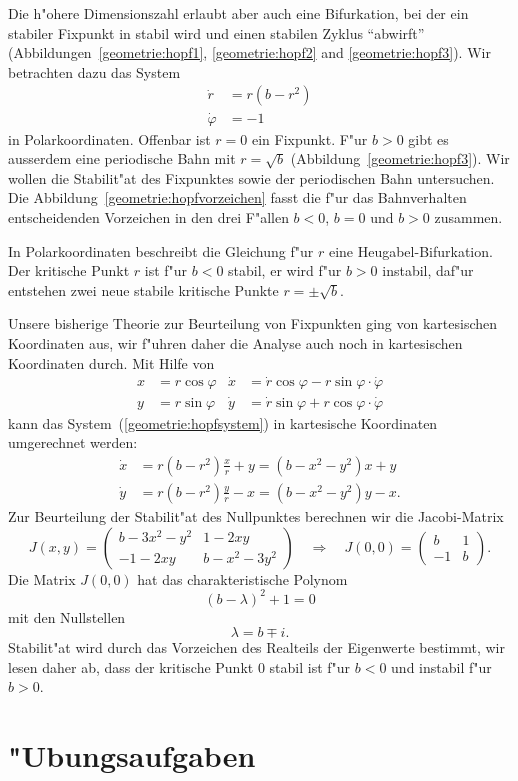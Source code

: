 Die h"ohere Dimensionszahl erlaubt aber auch eine Bifurkation, bei der
ein stabiler Fixpunkt in stabil wird und einen stabilen Zyklus ``abwirft''
(Abbildungen~\ref{geometrie:hopf1}, \ref{geometrie:hopf2} and
\ref{geometrie:hopf3}).
Wir betrachten dazu das System 
\begin{equation}
\begin{aligned}
\dot r      &= r(b-r^2)\\
\dot \varphi&= -1
\end{aligned}
\label{geometrie:hopfsystem}
\end{equation}
in Polarkoordinaten.
Offenbar ist $r=0$ ein Fixpunkt.
F"ur $b>0$ gibt es ausserdem eine periodische Bahn mit $r=\sqrt{b}$
(Abbildung~\ref{geometrie:hopf3}).
Wir wollen die Stabilit"at des Fixpunktes sowie der periodischen Bahn
untersuchen.
Die Abbildung~\ref{geometrie:hopfvorzeichen} fasst die f"ur das Bahnverhalten
entscheidenden Vorzeichen in den drei F"allen $b<0$, $b=0$ und $b>0$
zusammen.

In Polarkoordinaten beschreibt die Gleichung f"ur $r$ eine
Heugabel-Bifurkation.
Der kritische Punkt $r$ ist f"ur $b<0$ stabil, er wird f"ur $b>0$
instabil, daf"ur entstehen zwei neue stabile kritische Punkte
$r=\pm\sqrt{b}$.

Unsere bisherige Theorie zur Beurteilung von Fixpunkten ging von
kartesischen Koordinaten aus, wir f"uhren daher die Analyse auch noch
in kartesischen Koordinaten durch.
Mit Hilfe von 
\[
\begin{aligned}
x&=r\cos\varphi&\dot x&=\dot r\cos\varphi-r\sin\varphi\cdot\dot\varphi\\
y&=r\sin\varphi&\dot y&=\dot r\sin\varphi+r\cos\varphi\cdot\dot\varphi
\end{aligned}
\]
kann das System~(\ref{geometrie:hopfsystem}) in kartesische Koordinaten
umgerechnet werden:
\begin{equation}
\begin{aligned}
\dot x&=r(b-r^2)\frac{x}{r}+y=(b-x^2-y^2)x+y\\
\dot y&=r(b-r^2)\frac{y}{r}-x=(b-x^2-y^2)y-x.
\end{aligned}
\label{geometrie:hopf-kartesisch}
\end{equation}
Zur Beurteilung der Stabilit"at des Nullpunktes berechnen wir die
Jacobi-Matrix
\[
J(x,y)=
\begin{pmatrix}
b-3x^2-y^2&1-2xy\\
-1-2xy&b-x^2-3y^2
\end{pmatrix}
\quad\Rightarrow\quad
J(0,0)=\begin{pmatrix}
b&1\\-1&b
\end{pmatrix}.
\]
Die Matrix $J(0,0)$ hat das charakteristische Polynom
\[
(b-\lambda)^2+1=0
\]
mit den Nullstellen
\[
\lambda=b\mp i.
\]
Stabilit"at wird durch das Vorzeichen des Realteils der Eigenwerte
bestimmt, wir lesen daher ab, dass der kritische Punkt $0$ stabil
ist f"ur $b<0$ und instabil f"ur $b>0$.

\section{"Ubungsaufgaben}
\begin{uebungsaufgaben}
\item

\end{uebungsaufgaben}
